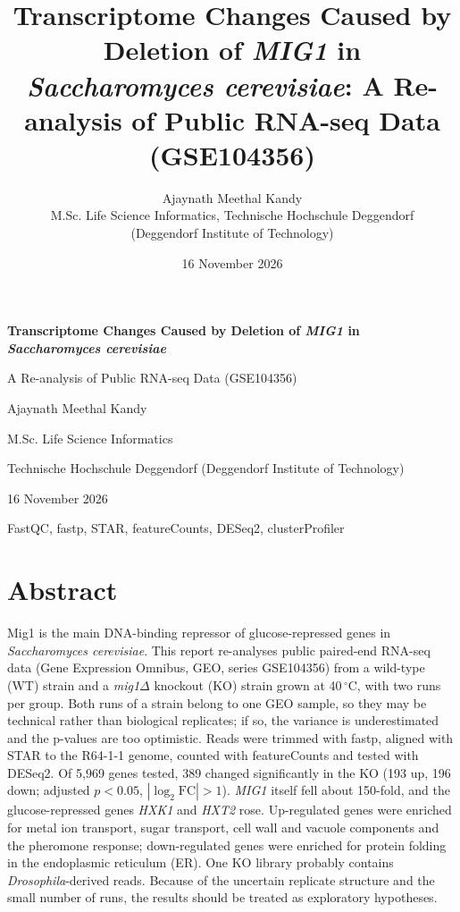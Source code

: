 \documentclass[11pt, a4paper]{article}
\title{Transcriptome Changes Caused by Deletion of \textit{MIG1} in \textit{Saccharomyces cerevisiae}: A Re-analysis of Public RNA-seq Data (GSE104356)}
\author{Ajaynath Meethal Kandy\\ \small M.Sc. Life Science Informatics, Technische Hochschule Deggendorf\\ \small (Deggendorf Institute of Technology)}
\date{16 November 2026}
\newcommand{\gene}[1]{\textit{#1}}
\newcommand{\mig}{\textit{mig1}$\Delta$}
\newcommand{\degC}{\,$^\circ$C}
\begin{document}
\begin{titlepage}
\centering
\vspace*{3cm}
{\LARGE\bfseries Transcriptome Changes Caused by Deletion of \textit{MIG1} in \textit{Saccharomyces cerevisiae}\par}
\vspace{0.8cm}
{\Large A Re-analysis of Public RNA-seq Data (GSE104356)\par}
\vspace{3cm}
{\large Ajaynath Meethal Kandy\par}
\vspace{0.3cm}
{\normalsize M.Sc. Life Science Informatics\par}
{\normalsize Technische Hochschule Deggendorf (Deggendorf Institute of Technology)\par}
\vspace{0.5cm}
{\large 16 November 2026\par}
\vfill
{\normalsize FastQC, fastp, STAR, featureCounts, DESeq2, clusterProfiler\par}
\end{titlepage}

\tableofcontents
\clearpage

\section*{Abstract}
Mig1 is the main DNA-binding repressor of glucose-repressed genes in \textit{Saccharomyces cerevisiae}. This report re-analyses public paired-end RNA-seq data (Gene Expression Omnibus, GEO, series GSE104356) from a wild-type (WT) strain and a \mig{} knockout (KO) strain grown at 40\degC, with two runs per group. Both runs of a strain belong to one GEO sample, so they may be technical rather than biological replicates; if so, the variance is underestimated and the p-values are too optimistic. Reads were trimmed with fastp, aligned with STAR to the R64-1-1 genome, counted with featureCounts and tested with DESeq2. Of 5,969 genes tested, 389 changed significantly in the KO (193 up, 196 down; adjusted $p<0.05$, $|\log_2\mathrm{FC}|>1$). \gene{MIG1} itself fell about 150-fold, and the glucose-repressed genes \gene{HXK1} and \gene{HXT2} rose. Up-regulated genes were enriched for metal ion transport, sugar transport, cell wall and vacuole components and the pheromone response; down-regulated genes were enriched for protein folding in the endoplasmic reticulum (ER). One KO library probably contains \textit{Drosophila}-derived reads. Because of the uncertain replicate structure and the small number of runs, the results should be treated as exploratory hypotheses.
\end{document}
